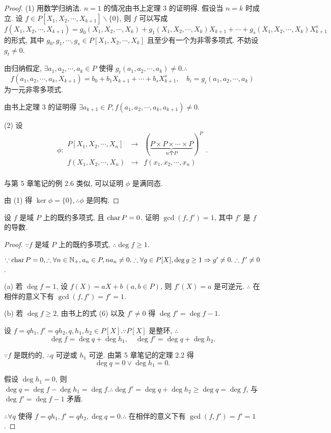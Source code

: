 \documentclass[UTF8]{ctexart}
\begin{document}
\begin{proof}
    (1) 用数学归纳法. $n=1$ 的情况由书上定理 3 的证明得. 假设当 $n=k$ 时成立. 设 $f\in P[X_1,X_2,\cdots,X_{k+1}]\backslash\{0\}$, 则 $f$ 可以写成
    \[f(X_1,X_2,\cdots,X_{k+1})=g_0(X_1,X_2,\cdots,X_k)+g_1(X_1,X_2,\cdots,X_k)X_{k+1}+\cdots+g_s(X_1,X_2,\cdots,X_k)X^s_{k+1}\]
    的形式, 其中 $g_0,g_1,\cdots,g_s\in P[X_1,X_2,\cdots,X_k]$ 且至少有一个为非零多项式. 不妨设 $g_t\neq0$.

    由归纳假定, $\exists a_1,a_2,\cdots,a_k\in P$ 使得 $g_t(a_1,a_2,\cdots,a_k)\neq0.\therefore$
    \[f(a_1,a_2,\cdots,a_k,X_{k+1})=b_0+b_1X_{k+1}+\cdots+b_sX^s_{k+1},\quad b_i=g_i(a_1,a_2,\cdots,a_k)\]
    为一元非零多项式.

    由书上定理 3 的证明得 $\exists a_{k+1}\in P,f(a_1,a_2,\cdots,a_k,a_{k+1})\neq0$.

    (2) 设
    \[\phi:\begin{array}{rcl}
        P[X_1,X_2,\cdots,X_n] & \to & (\underbrace{P\times P\times\cdots\times P}_{n\text{个}P})^P \\
        f(X_1,X_2,\cdots,X_n) & \to & f(x_1,x_2,\cdots,x_n) \\
    \end{array}.\]

    与第 5 章笔记的例 2.6 类似, 可以证明 $\phi$ 是满同态.

    由 (1) 得 $\ker\phi=\{0\},\therefore\phi$ 是同构.
\end{proof}
\addtocounter{exercise}{3}
\begin{exercise}\label{ex1.6}
    设 $f$ 是域 $P$ 上的既约多项式, 且 $\operatorname{char} P=0$. 证明 $\gcd(f,f')=1$, 其中 $f'$ 是 $f$ 的导数.
\end{exercise}
\begin{proof}
    $\because f$ 是域 $P$ 上的既约多项式, $\therefore\deg f\geq1$.

    $\because\operatorname{char} P=0,\therefore\forall n\in\mathbb{N}_+,a_n\in P,na_n\neq0.\therefore\forall g\in P[X],\deg g\geq1\Rightarrow g'\neq0.\therefore f'\neq0$.

    (a) 若 $\deg f=1$, 设 $f(X)=aX+b\ (a,b\in P)$, 则 $f'(X)=a$ 是可逆元. $\therefore$ 在相伴的意义下有 $\gcd(f,f')=f'=1$.

    (b) 若 $\deg f\geq2$, 由书上的式 (6) 以及 $f'\neq0$ 得 $\deg f'=\deg f-1$.
    
    设 $f=qh_1,f'=qh_2,q,h_1,h_2\in P[X].\because P[X]$ 是整环, $\therefore$
    \[\deg f=\deg q+\deg h_1,\quad\deg f'=\deg q+\deg h_2.\]

    $\because f$ 是既约的, $\therefore q$ 可逆或 $h_1$ 可逆. 由第 5 章笔记的定理 2.2 得
    \[\deg q=0\vee\deg h_1=0.\]

    假设 $\deg h_1=0$, 则 $\deg q=\deg f-\deg h_1=\deg f.\therefore\deg f'=\deg q+\deg h_2\geq\deg q=\deg f$, 与 $\deg f'=\deg f-1$ 矛盾.

    $\therefore\forall q$ 使得 $f=qh_1,f'=qh_2,\deg q=0.\therefore$ 在相伴的意义下有 $\gcd(f,f')=f'=1$.
\end{proof}
\end{document}
